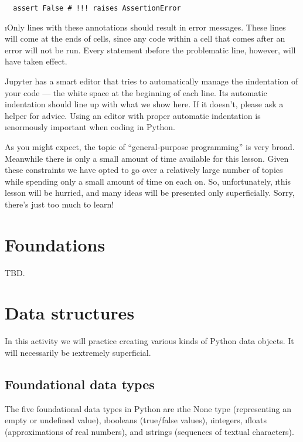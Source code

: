 \documentclass[letterpaper, 12pt, titlepage, twoside]{article}
\begin{document}
\begin{lstlisting}
  assert False # !!! raises AssertionError
\end{lstlisting}

\i{Only} lines with these annotations should result in error messages. These
lines will come at the ends of cells, since any code within a cell that comes
after an error will not be run. Every statement \i{before} the problematic
line, however, will have taken effect.

Jupyter has a smart editor that tries to automatically manage the
\i{indentation} of your code --- the white space at the beginning of each
line. Its automatic indentation should line up with what we show here. If it
doesn't, please ask a helper for advice. Using an editor with proper automatic
indentation is \i{enormously} important when coding in Python.

As you might expect, the topic of ``general-purpose programming'' is very
broad. Meanwhile there is only a small amount of time available for this
lesson. Given these constraints we have opted to go over a relatively large
number of topics while spending only a small amount of time on each on. So,
unfortunately, \i{this lesson will be hurried, and many ideas will be
  presented only superficially}. Sorry, there's just too much to learn!


\newpage
\section{Foundations}

TBD.


\newpage
\section{Data structures}

In this activity we will practice creating various kinds of Python data
objects. It will necessarily be \i{extremely} superficial.

\subsection*{Foundational data types}

The five foundational data types in Python are \i{the None type} (representing
an empty or undefined value), \i{booleans} (true/false values), \i{integers},
\i{floats} (approximations of real numbers), and \i{strings} (sequences of
textual characters).
\end{document}
